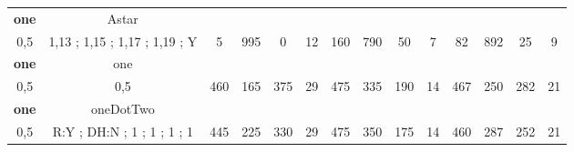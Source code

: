 \begin{table}[]
{\begin{tabular}{|c|c|c|c|c|c|c|c|c|c|c|c|c|c|}
\cellcolor{blue!15}\textbf{one} & Astar& {\color[HTML]{00009B} } & {\color[HTML]{9A0000} } & {\color[HTML]{009901} } &  & {\color[HTML]{00009B} } & {\color[HTML]{9A0000} } & {\color[HTML]{009901} } &  & {\color[HTML]{00009B} } & {\color[HTML]{9A0000} } & {\color[HTML]{009901} } &  \\ 
\cellcolor{ blue!15}0,5 & 1,13 ; 1,15 ; 1,17 ; 1,19 ; Y & \multirow{-2}{*}{{\color[HTML]{00009B} 5}} & \multirow{-2}{*}{{\color[HTML]{9A0000} 995}} & \multirow{-2}{*}{{\color[HTML]{009901} 0}} & \multirow{-2}{*}{12} & \multirow{-2}{*}{{\color[HTML]{00009B} 160}} & \multirow{-2}{*}{{\color[HTML]{9A0000} 790}} & \multirow{-2}{*}{{\color[HTML]{009901} 50}} & \multirow{-2}{*}{7} & \multirow{-2}{*}{{\color[HTML]{00009B} 82}} & \multirow{-2}{*}{{\color[HTML]{9A0000} 892}} & \multirow{-2}{*}{{\color[HTML]{009901} 25}} & \multirow{-2}{*}{9} \\ \hline

\cellcolor{blue!15}\textbf{one} & one& {\color[HTML]{00009B} } & {\color[HTML]{9A0000} } & {\color[HTML]{009901} } &  & {\color[HTML]{00009B} } & {\color[HTML]{9A0000} } & {\color[HTML]{009901} } &  & {\color[HTML]{00009B} } & {\color[HTML]{9A0000} } & {\color[HTML]{009901} } &  \\ 
\cellcolor{ blue!15}0,5 & 0,5 & \multirow{-2}{*}{{\color[HTML]{00009B} 460}} & \multirow{-2}{*}{{\color[HTML]{9A0000} 165}} & \multirow{-2}{*}{{\color[HTML]{009901} 375}} & \multirow{-2}{*}{29} & \multirow{-2}{*}{{\color[HTML]{00009B} 475}} & \multirow{-2}{*}{{\color[HTML]{9A0000} 335}} & \multirow{-2}{*}{{\color[HTML]{009901} 190}} & \multirow{-2}{*}{14} & \multirow{-2}{*}{{\color[HTML]{00009B} 467}} & \multirow{-2}{*}{{\color[HTML]{9A0000} 250}} & \multirow{-2}{*}{{\color[HTML]{009901} 282}} & \multirow{-2}{*}{21} \\ \hline

\cellcolor{blue!15}\textbf{one} & oneDotTwo& {\color[HTML]{00009B} } & {\color[HTML]{9A0000} } & {\color[HTML]{009901} } &  & {\color[HTML]{00009B} } & {\color[HTML]{9A0000} } & {\color[HTML]{009901} } &  & {\color[HTML]{00009B} } & {\color[HTML]{9A0000} } & {\color[HTML]{009901} } &  \\ 
\cellcolor{ blue!15}0,5 & R:Y ; DH:N ; 1 ; 1 ; 1 ; 1 & \multirow{-2}{*}{{\color[HTML]{00009B} 445}} & \multirow{-2}{*}{{\color[HTML]{9A0000} 225}} & \multirow{-2}{*}{{\color[HTML]{009901} 330}} & \multirow{-2}{*}{29} & \multirow{-2}{*}{{\color[HTML]{00009B} 475}} & \multirow{-2}{*}{{\color[HTML]{9A0000} 350}} & \multirow{-2}{*}{{\color[HTML]{009901} 175}} & \multirow{-2}{*}{14} & \multirow{-2}{*}{{\color[HTML]{00009B} 460}} & \multirow{-2}{*}{{\color[HTML]{9A0000} 287}} & \multirow{-2}{*}{{\color[HTML]{009901} 252}} & \multirow{-2}{*}{21} \\ \hline


\end{tabular}}
\end{table}
